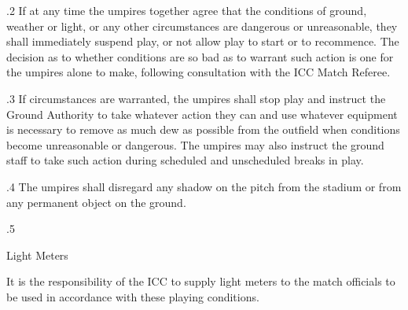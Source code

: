 \documentclass[12pt]{article}
\begin{document}
\vspace{\baselineskip}
\begin{adjustwidth}{0.5in}{0.14in}
{\fontsize{9pt}{10.8pt}.2 \tabto{0.49in} If at any time the umpires together agree that the conditions of ground, weather or light, or any other circumstances are dangerous or unreasonable, they shall immediately suspend play, or not allow play to start or to recommence. The decision as to whether conditions are so bad as to warrant such action is one for the umpires alone to make, following consultation with the ICC Match Referee.\par}\par

\end{adjustwidth}


\vspace{\baselineskip}
\begin{adjustwidth}{0.5in}{0.19in}
{\fontsize{9pt}{10.8pt}.3 \tabto{0.49in} If circumstances are warranted, the umpires shall stop play and instruct the Ground Authority to take whatever action they can and use whatever equipment is necessary to remove as much dew as possible from the outfield when conditions become unreasonable or dangerous. The umpires may also instruct the ground staff to take such action during scheduled and unscheduled breaks in play.\par}\par

\end{adjustwidth}


\vspace{\baselineskip}
\begin{adjustwidth}{0.5in}{0.06in}
{\fontsize{9pt}{10.8pt}.4 \tabto{0.49in} The umpires shall disregard any shadow on the pitch from the stadium or from any permanent object on the ground.\par}\par

\end{adjustwidth}


\vspace{\baselineskip}
{\fontsize{9pt}{10.8pt}.5 \tabto{0.49in} {\fontsize{8pt}{9.6pt}\selectfont Light Meters\par}\par}\par


\vspace{\baselineskip}
\begin{adjustwidth}{0.5in}{0.17in}
{\fontsize{9pt}{10.8pt}\selectfont It is the responsibility of the ICC to supply light meters to the match officials to be used in accordance with these playing conditions.\par}\par

\end{adjustwidth}
\end{document}

